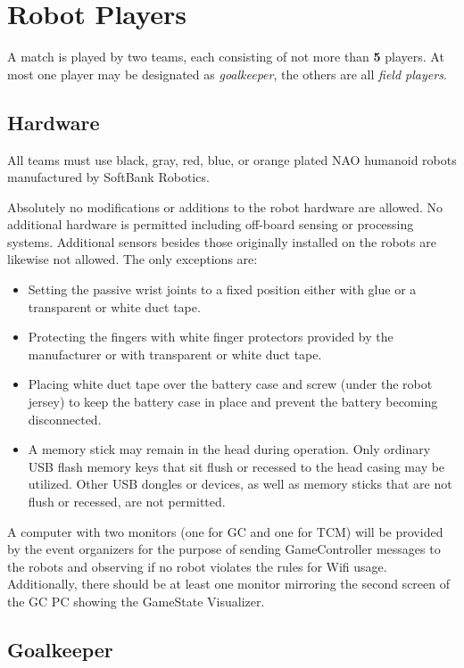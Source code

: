 \section{Robot Players}
\label{sec:robot_players}
A match is played by two teams, each consisting of not more than \textbf{5} players. At most one player may be designated as \emph{goalkeeper}, the others are all \emph{field players}.

\subsection{Hardware}
\label{sec:hardware}
All teams must use black, gray, red, blue, or orange plated NAO humanoid robots manufactured by SoftBank Robotics.

Absolutely no modifications or additions to the robot hardware are allowed. No additional hardware is permitted including off-board sensing or processing systems. Additional sensors besides those originally installed on the robots are likewise not allowed. The only exceptions are:

\begin{itemize}
    \item Setting the passive wrist joints to a fixed position either with glue or a transparent or white duct tape.
    \item Protecting the fingers with white finger protectors provided by the manufacturer or with transparent or white duct tape.
    \item Placing white duct tape over the battery case and screw (under the robot jersey) to keep the battery case in place and prevent the battery becoming disconnected.
    \item A memory stick may remain in the head during operation.  Only ordinary USB flash memory keys that sit flush or recessed to the head casing may be utilized. Other USB dongles or devices, as well as memory sticks that are not flush or recessed, are not permitted.
\end{itemize}

A computer with two monitors (one for GC and one for TCM) will be provided by the event organizers for the purpose of sending GameController messages to the robots and observing if no robot violates the rules for Wifi usage.
Additionally, there should be at least one monitor mirroring the second screen of the GC PC showing the GameState Visualizer. 

\subsection{Goalkeeper}
\label{sec:goalkeeper}

